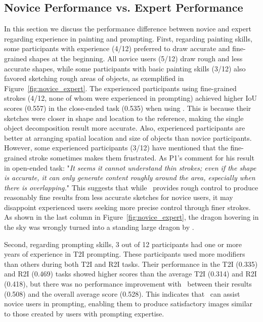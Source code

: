 \subsection{Novice Performance vs. Expert Performance}\label{sec:nVe}
In this section we discuss the performance difference between novice and expert regarding experience in painting and prompting.
First, regarding painting skills, some participants with experience (4/12) preferred to draw accurate and fine-grained shapes at the beginning. 
All novice users (5/12) draw rough and less accurate shapes, while some participants with basic painting skills (3/12) also favored sketching rough areas of objects, as exemplified in Figure~\ref{fig:novice_expert}.
The experienced participants using fine-grained strokes (4/12, none of whom were experienced in prompting) achieved higher IoU scores (0.557) in the close-ended task (0.535) when using \tool. 
This is because their sketches were closer in shape and location to the reference, making the single object decomposition result more accurate.
Also, experienced participants are better at arranging spatial location and size of objects than novice participants.
However, some experienced participants (3/12) have mentioned that the fine-grained stroke sometimes makes them frustrated.
As P1's comment for his result in open-ended task: "\emph{It seems it cannot understand thin strokes; even if the shape is accurate, it can only generate content roughly around the area, especially when there is overlapping.}" 
This suggests that while \tool\ provides rough control to produce reasonably fine results from less accurate sketches for novice users, it may disappoint experienced users seeking more precise control through finer strokes. 
As shown in the last column in Figure~\ref{fig:novice_expert}, the dragon hovering in the sky was wrongly turned into a standing large dragon by \tool.

Second, regarding prompting skills, 3 out of 12 participants had one or more years of experience in T2I prompting. These participants used more modifiers than others during both T2I and R2I tasks.
Their performance in the T2I (0.335) and R2I (0.469) tasks showed higher scores than the average T2I (0.314) and R2I (0.418), but there was no performance improvement with \tool\ between their results (0.508) and the overall average score (0.528). 
This indicates that \tool\ can assist novice users in prompting, enabling them to produce satisfactory images similar to those created by users with prompting expertise.



